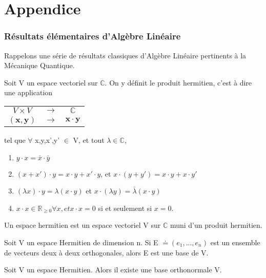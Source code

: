 \documentclass[../notesdecours.tex]{subfiles}
\begin{document}
\appendix
\part{Appendice}
\section{Résultats élémentaires d'Algèbre Linéaire}
\label{AppendeiceA}
Rappelons une série de résultats classiques d'Algèbre Linéaire pertinents à la Mécanique Quantique.\\

\begin{definition} Soit V un espace vectoriel sur $\mathbb{C}$. On y définit le produit hermitien, c'est à dire une application
\begin{center}
\begin{tabular}{c c c}
$V \times V$ & $\rightarrow$ & $\mathbb{C}$\\
$\left(\bm{x},\bm{y}\right)$ &  $\rightarrow$ & $\bm{x} \cdot \bm{y}$
\end{tabular}
\end{center}
tel que $\forall$ x,y,x',y' $\in$ V, et tout $\lambda \in \mathbb{C}$,
\begin{enumerate}
\item $y\cdot x = \bar{x} \cdot \bar{y}$
\item $\left( x+x' \right) \cdot y = x \cdot y + x' \cdot y$, et $x\cdot(y+y') = x\cdot y+x\cdot y'$
\item $\left( \lambda x \right)\cdot y = \lambda \left(x\cdot y\right)$ et $x\cdot (\lambda y) = \bar{\lambda} (x\cdot y)$
\item $x \cdot x \in \mathbb{R}_{\geq 0} \forall x, et x \cdot x = 0$ si et seulement si $x = 0$.
\end{enumerate}
Un espace hermitien est un espace vectoriel V sur $\mathbb{C}$ muni d'un produit hermitien.
\end{definition}

\begin{Property}
Soit V un espace Hermitien de dimension n. Si E $\doteq \left(e_1,...,e_n\right)$ est un ensemble de vecteurs deux à deux orthogonales, alors E est une base de V. 
\end{Property}


\begin{Property} Soit V un espace Hermitien. Alors il existe une base orthonormale V. \end{Property}
\end{document}
